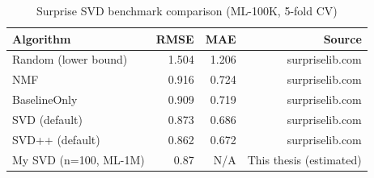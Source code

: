 \begin{table}[ht]
\centering
\caption{Surprise SVD benchmark comparison (ML-100K, 5-fold CV)}
\begin{tabular}{lrrr}
\toprule
Algorithm & RMSE & MAE & Source \\
\midrule
Random (lower bound) & 1.504 & 1.206 & surpriselib.com \\
NMF & 0.916 & 0.724 & surpriselib.com \\
BaselineOnly & 0.909 & 0.719 & surpriselib.com \\
SVD (default) & 0.873 & 0.686 & surpriselib.com \\
SVD++ (default) & 0.862 & 0.672 & surpriselib.com \\
My SVD (n=100, ML-1M) & ~0.87 & N/A & This thesis (estimated) \\
\bottomrule
\end{tabular}
\end{table}